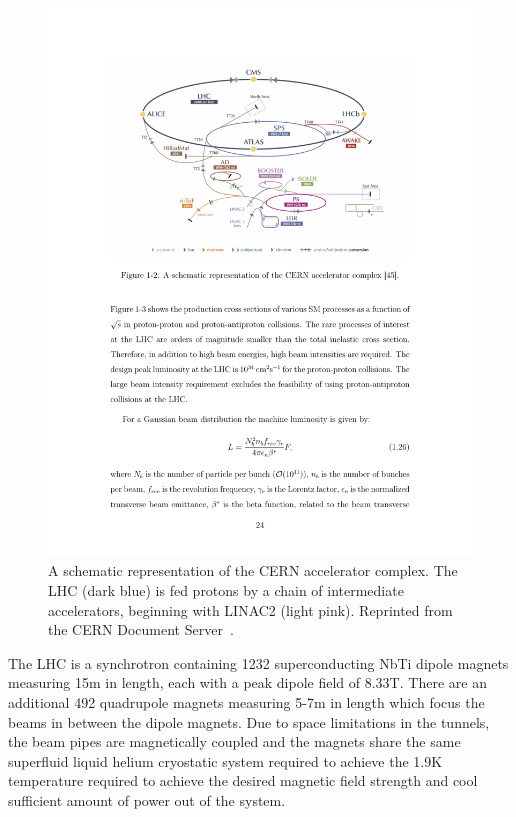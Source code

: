 \begin{figure}[htbp]
  \centering
  \includegraphics[width=.775\textwidth]{Collider/Figures/LHC_diagram.pdf}
  \caption{
    A schematic representation of the CERN accelerator complex. 
    The LHC (dark blue) is fed protons by a chain of intermediate accelerators, beginning with LINAC2 (light pink).
    Reprinted from the CERN Document Server~\cite{Mobs2018}. 
  }
  \label{fig:lhc}
\end{figure}


The LHC is a synchrotron containing 1232 superconducting NbTi dipole magnets measuring 15\unit{m} in length, each with a peak dipole field of 8.33\unit{T}. 
There are an additional 492 quadrupole magnets measuring 5-7\unit{m} in length which focus the beams in between the dipole magnets.
Due to space limitations in the tunnels, the beam pipes are magnetically coupled and the magnets share the same superfluid liquid helium cryostatic system required to achieve the 1.9\unit{K} temperature required to achieve the desired magnetic field strength and cool sufficient amount of power out of the system.

